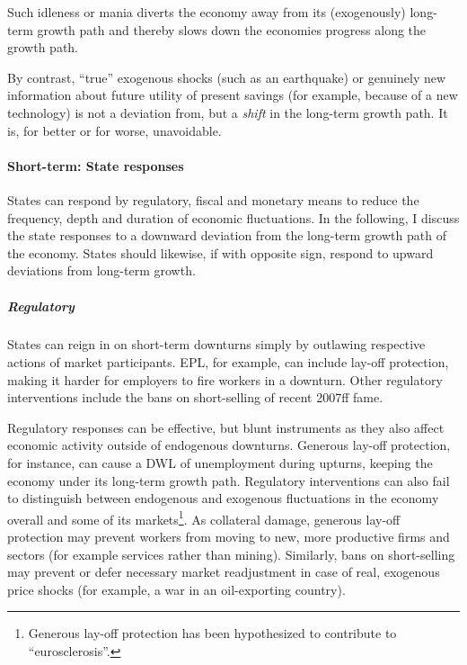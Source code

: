 Such idleness or mania diverts the economy away from its (exogenously) long-term growth path and thereby slows down the economies progress along the growth path.

By contrast, ``true'' exogenous shocks (such as an earthquake) or genuinely new information about future utility of present savings (for example, because of a new technology) is not a deviation from, but a \emph{shift} in the long-term growth path. It is, for better or for worse, unavoidable.

\paragraph{Short-term: State responses}
States can respond by regulatory, fiscal and monetary means to reduce the frequency, depth and duration of economic fluctuations.
In the following, I discuss the state responses to a downward deviation from the long-term growth path of the economy. States should likewise, if with opposite sign, respond to upward deviations from long-term growth.

\subparagraph{Regulatory}
States can reign in on short-term downturns simply by outlawing respective actions of market participants. \gls{EPL}, for example, can include lay-off protection, making it harder for employers to fire workers in a downturn. Other regulatory interventions include the bans on short-selling of recent 2007ff fame. %

Regulatory responses can be effective, but blunt instruments as they also affect economic activity outside of endogenous downturns. Generous lay-off protection, for instance, can cause a \gls{DWL} of unemployment during upturns, keeping the economy under its long-term growth path. Regulatory interventions can also fail to distinguish between endogenous and exogenous fluctuations in the economy overall and some of its markets\footnote{
	Generous lay-off protection has been hypothesized to contribute to ``eurosclerosis''.}. %
As collateral damage, generous lay-off protection may prevent workers from moving to new, more productive firms and sectors (for example services rather than mining). Similarly, bans on short-selling may prevent or defer necessary market readjustment in case of real, exogenous price shocks (for example, a war in an oil-exporting country).

